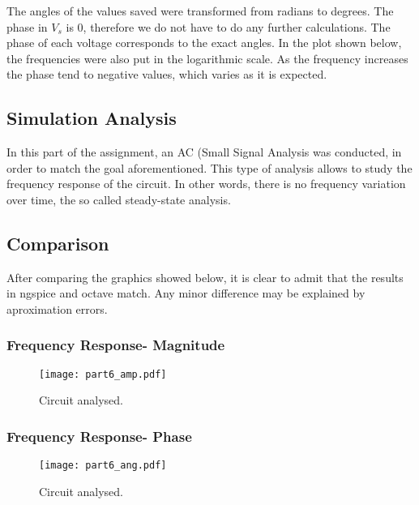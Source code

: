 The angles of the values saved were transformed from radians to degrees. The phase in $V_s$ is 0, therefore we do not have to do any further calculations. The phase of each voltage corresponds to the exact angles. In the plot shown below, the frequencies were also  put in the logarithmic scale. As the frequency increases the phase tend to negative values, which varies as it is expected.


\subsection{Simulation Analysis}
In this part of the assignment, an AC (Small Signal Analysis was conducted, in order to match the goal aforementioned. This type of analysis allows to study the frequency response of the circuit. In other words, there is no frequency variation over time, the so called steady-state analysis.

\subsection{Comparison}
After comparing the graphics showed below, it is clear to admit that the results in ngspice and octave match. Any minor difference may be explained by aproximation errors.

\subsubsection{Frequency Response- Magnitude}


\begin{figure}[ht] \centering
\texttt{[image: part6\_amp.pdf]}
\caption{Circuit analysed.}
\label{RC Circuit.}
\end{figure}



\subsubsection{Frequency Response- Phase}

\begin{figure}[ht] \centering
\texttt{[image: part6\_ang.pdf]}
\caption{Circuit analysed.}
\label{RC Circuit.}
\end{figure}

















